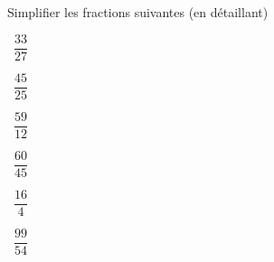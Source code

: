 Simplifier les fractions suivantes (en détaillant)
\begin{questions}
	
	
	\question[2]  $\dfrac{33}{27}$
	\fillwithdottedlines{1.5cm}
	\begin{solution}
		
	\end{solution}

	
	
	
	
	\question[2]  $\dfrac{45}{25}$
	\fillwithdottedlines{1.5cm}
	\begin{solution}
		
	\end{solution}
	
	

	
	
	\question[2]  $\dfrac{59}{12}$
	\fillwithdottedlines{1.5cm}
	\begin{solution}
		
	\end{solution}

	\question[2]  $\dfrac{60}{45}$
	\fillwithdottedlines{1.5cm}
	\begin{solution}
		
	\end{solution}
	
	\question[2]  $\dfrac{16}{4}$
	\fillwithdottedlines{1.5cm}
	\begin{solution}
		
	\end{solution}
	
		\question[2]  $\dfrac{99}{54}$
	\fillwithdottedlines{1.5cm}
	\begin{solution}
		
	\end{solution}
	

\end{questions}


